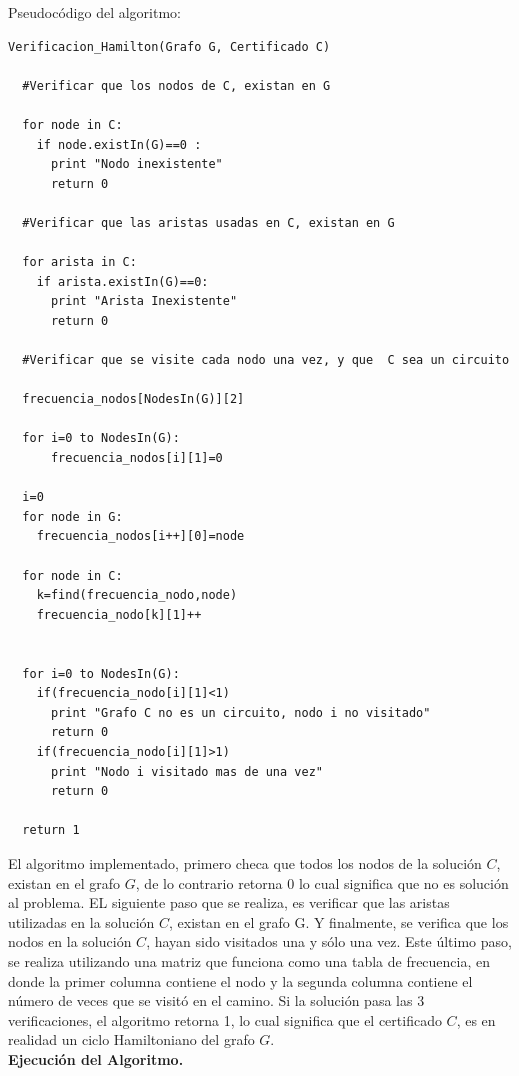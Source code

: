 \documentclass[12pt]{report}
\begin{document}
Pseudocódigo del algoritmo:
\lstset{language=python, breaklines=true, basicstyle=\footnotesize}
\lstset{numbers=left, numberstyle=\tiny, stepnumber=1, numbersep=10pt}
\begin{lstlisting}
Verificacion_Hamilton(Grafo G, Certificado C)

  #Verificar que los nodos de C, existan en G
  
  for node in C:
    if node.existIn(G)==0 :
      print "Nodo inexistente"
      return 0
     
  #Verificar que las aristas usadas en C, existan en G 
  
  for arista in C:
    if arista.existIn(G)==0:
      print "Arista Inexistente"
      return 0

  #Verificar que se visite cada nodo una vez, y que  C sea un circuito
  
  frecuencia_nodos[NodesIn(G)][2]
  
  for i=0 to NodesIn(G):
      frecuencia_nodos[i][1]=0
  
  i=0
  for node in G:
    frecuencia_nodos[i++][0]=node
    
  for node in C:
    k=find(frecuencia_nodo,node)
    frecuencia_nodo[k][1]++
    
  
  for i=0 to NodesIn(G):
    if(frecuencia_nodo[i][1]<1)
      print "Grafo C no es un circuito, nodo i no visitado"
      return 0
    if(frecuencia_nodo[i][1]>1)
      print "Nodo i visitado mas de una vez"
      return 0
  
  return 1
\end{lstlisting}

El algoritmo implementado, primero checa que todos los nodos de la solución $C$, existan en el grafo $G$, de lo contrario retorna 0 lo cual significa que no es solución al problema. EL siguiente paso que se realiza, es verificar que las aristas utilizadas en la solución $C$, existan en el grafo G. Y finalmente, se verifica que los nodos en la solución $C$, hayan sido visitados una y sólo una vez. Este último paso, se realiza utilizando una matriz que funciona como una tabla de frecuencia, en donde la primer columna contiene el nodo y la segunda columna contiene el número de veces que se visitó en el camino. Si la solución pasa las 3 verificaciones, el algoritmo retorna 1, lo cual significa que el certificado $C$, es en realidad un ciclo Hamiltoniano del grafo $G$. 
\\

\textbf{Ejecución del Algoritmo.}\\
	
\end{document}
